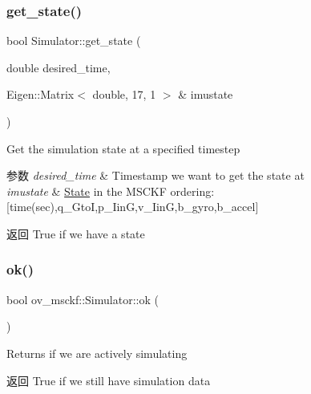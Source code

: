 \subsubsection{\texorpdfstring{get\+\_\+state()}{get\_state()}}
{\footnotesize\ttfamily bool Simulator\+::get\+\_\+state (\begin{DoxyParamCaption}\item[{double}]{desired\+\_\+time,  }\item[{Eigen\+::\+Matrix$<$ double, 17, 1 $>$ \&}]{imustate }\end{DoxyParamCaption})}



Get the simulation state at a specified timestep 


\begin{DoxyParams}{参数}
{\em desired\+\_\+time} & Timestamp we want to get the state at \\
\hline
{\em imustate} & \hyperlink{classov__msckf_1_1State}{State} in the M\+S\+C\+KF ordering\+: \mbox{[}time(sec),q\+\_\+\+GtoI,p\+\_\+\+IinG,v\+\_\+\+IinG,b\+\_\+gyro,b\+\_\+accel\mbox{]} \\
\hline
\end{DoxyParams}
\begin{DoxyReturn}{返回}
True if we have a state 
\end{DoxyReturn}
\mbox{\label{classov__msckf_1_1Simulator_a23596249c56e31c4a74567b4f4601a7c}} 
\subsubsection{\texorpdfstring{ok()}{ok()}}
{\footnotesize\ttfamily bool ov\+\_\+msckf\+::\+Simulator\+::ok (\begin{DoxyParamCaption}{ }\end{DoxyParamCaption})\hspace{0.3cm}{\ttfamily [inline]}}



Returns if we are actively simulating 

\begin{DoxyReturn}{返回}
True if we still have simulation data 
\end{DoxyReturn}
\mbox{\label{classov__msckf_1_1Simulator_ab7b38fccf364b602eef8294524f3f30a}} 
